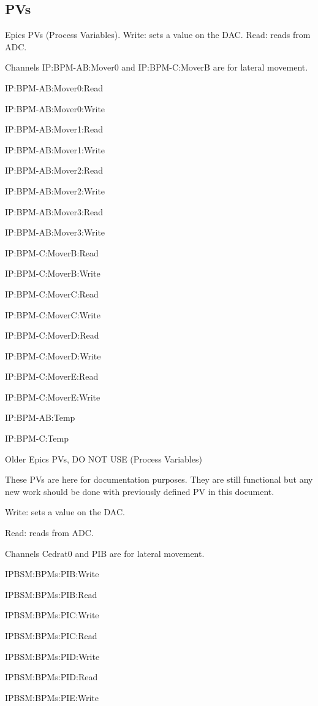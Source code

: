\subsection{PVs}
Epics PVs (Process Variables). Write: sets a value on the DAC. Read: reads from ADC.\par
Channels IP:BPM-AB:Mover0 and IP:BPM-C:MoverB are for lateral movement.\par
IP:BPM-AB:Mover0:Read\par
IP:BPM-AB:Mover0:Write\par
IP:BPM-AB:Mover1:Read\par
IP:BPM-AB:Mover1:Write\par
IP:BPM-AB:Mover2:Read\par
IP:BPM-AB:Mover2:Write\par
IP:BPM-AB:Mover3:Read\par
IP:BPM-AB:Mover3:Write\par 
IP:BPM-C:MoverB:Read\par 
IP:BPM-C:MoverB:Write\par 
IP:BPM-C:MoverC:Read\par 
IP:BPM-C:MoverC:Write\par 
IP:BPM-C:MoverD:Read\par 
IP:BPM-C:MoverD:Write\par 
IP:BPM-C:MoverE:Read\par 
IP:BPM-C:MoverE:Write\par 
IP:BPM-AB:Temp\par 
IP:BPM-C:Temp\par 
\vspace*{0.5cm}
Older Epics PVs, DO NOT USE (Process Variables)\par 
These PVs are here for documentation purposes. They are still functional but any new work should be done with previously defined PV in this document.\par 
Write: sets a value on the DAC.\par 
Read: reads from ADC.\par 
Channels Cedrat0 and PIB are for lateral movement.\par 
IPBSM:BPMs:PIB:Write\par 
IPBSM:BPMs:PIB:Read\par 
IPBSM:BPMs:PIC:Write\par 
IPBSM:BPMs:PIC:Read\par 
IPBSM:BPMs:PID:Write\par 
IPBSM:BPMs:PID:Read\par 
IPBSM:BPMs:PIE:Write\par 
